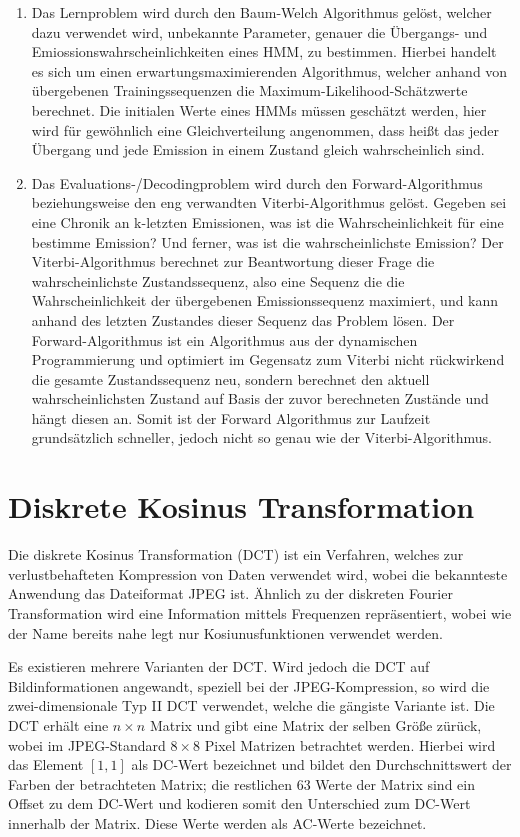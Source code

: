 \begin{enumerate}
	\item Das Lernproblem wird durch den Baum-Welch Algorithmus gelöst, welcher dazu verwendet wird, unbekannte Parameter, genauer die Übergangs- und Emiossionswahrscheinlichkeiten eines HMM, zu bestimmen.
 Hierbei handelt es sich um einen erwartungsmaximierenden Algorithmus, welcher anhand von übergebenen Trainingssequenzen die Maximum-Likelihood-Schätzwerte berechnet.
 Die initialen Werte eines HMMs müssen geschätzt werden, hier wird für gewöhnlich eine Gleichverteilung angenommen, dass heißt das jeder Übergang und jede Emission in einem Zustand gleich wahrscheinlich sind.

	\item Das Evaluations-/Decodingproblem wird durch den Forward-Algorithmus beziehungsweise den eng verwandten Viterbi-Algorithmus gelöst.
 Gegeben sei eine Chronik an k-letzten Emissionen, was ist die Wahrscheinlichkeit für eine bestimme Emission? Und ferner, was ist die wahrscheinlichste Emission? Der Viterbi-Algorithmus berechnet zur Beantwortung dieser Frage die wahrscheinlichste Zustandssequenz, also eine Sequenz die die Wahrscheinlichkeit der übergebenen Emissionssequenz maximiert, und kann anhand des letzten Zustandes dieser Sequenz das Problem lösen.
 Der Forward-Algorithmus ist ein Algorithmus aus der dynamischen Programmierung und optimiert im Gegensatz zum Viterbi nicht rückwirkend die gesamte Zustandssequenz neu, sondern berechnet den aktuell wahrscheinlichsten Zustand auf Basis der zuvor berechneten Zustände und hängt diesen an.
 Somit ist der Forward Algorithmus zur Laufzeit grundsätzlich schneller, jedoch nicht so genau wie der Viterbi-Algorithmus.
 \end{enumerate}


\section{Diskrete Kosinus Transformation}

Die diskrete Kosinus Transformation (DCT) ist ein Verfahren, welches zur verlustbehafteten Kompression von Daten verwendet wird, wobei die bekannteste Anwendung das Dateiformat JPEG ist.
 Ähnlich zu der diskreten Fourier Transformation wird eine Information mittels Frequenzen repräsentiert, wobei wie der Name bereits nahe legt nur Kosiunusfunktionen verwendet werden.
 

Es existieren mehrere Varianten der DCT.
 Wird jedoch die DCT auf Bildinformationen angewandt, speziell bei der JPEG-Kompression, so wird die zwei-dimensionale Typ II DCT verwendet, welche die gängiste Variante ist.
 Die DCT erhält eine $n \times  n$ Matrix und gibt eine Matrix der selben Größe zürück, wobei im JPEG-Standard $8 \times 8$ Pixel Matrizen betrachtet werden.
 Hierbei wird das Element $[1,1]$ als DC-Wert bezeichnet und bildet den Durchschnittswert der Farben der betrachteten Matrix; die restlichen 63 Werte der Matrix sind ein Offset zu dem DC-Wert und kodieren somit den Unterschied zum DC-Wert innerhalb der Matrix.
 Diese Werte werden als AC-Werte bezeichnet.


